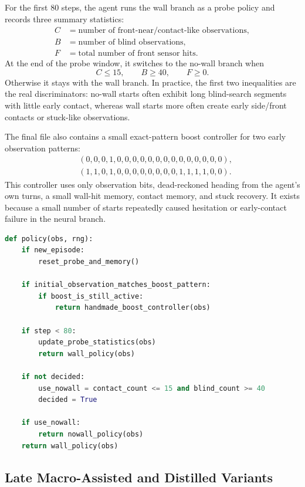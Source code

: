 \documentclass[11pt, oneside]{article}   	%
\begin{document}
For the first 80 steps, the agent runs the wall branch as a probe policy and records
three summary statistics:
\[
\begin{aligned}
  C &= \text{number of front-near/contact-like observations},\\
  B &= \text{number of blind observations},\\
  F &= \text{total number of front sensor hits}.
\end{aligned}
\]
At the end of the probe window, it switches to the no-wall branch when
\[
  C \le 15,
  \qquad
  B \ge 40,
  \qquad
  F \ge 0.
\]
Otherwise it stays with the wall branch. In practice, the first two inequalities are the
real discriminators: no-wall starts often exhibit long blind-search segments with little
early contact, whereas wall starts more often create early side/front contacts or
stuck-like observations.

The final file also contains a small exact-pattern boost controller for two early
observation patterns:
\[
\begin{aligned}
  &(0,0,0,1,0,0,0,0,0,0,0,0,0,0,0,0,0,0),\\
  &(1,1,0,1,0,0,0,0,0,0,0,0,1,1,1,1,0,0).
\end{aligned}
\]
This controller uses only observation bits, dead-reckoned heading from the agent's own
turns, a small wall-hit memory, contact memory, and stuck recovery. It exists because a
small number of starts repeatedly caused hesitation or early-contact failure in the neural
branch.

\begin{lstlisting}[language=Python,caption={High-level final policy logic.}]
def policy(obs, rng):
    if new_episode:
        reset_probe_and_memory()

    if initial_observation_matches_boost_pattern:
        if boost_is_still_active:
            return handmade_boost_controller(obs)

    if step < 80:
        update_probe_statistics(obs)
        return wall_policy(obs)

    if not decided:
        use_nowall = contact_count <= 15 and blind_count >= 40
        decided = True

    if use_nowall:
        return nowall_policy(obs)
    return wall_policy(obs)
\end{lstlisting}

\subsection{Late Macro-Assisted and Distilled Variants}
\end{document}
